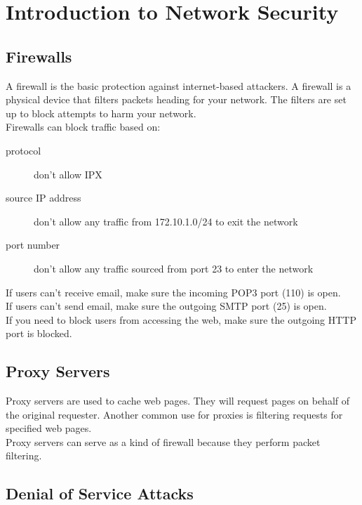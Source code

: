 \section{Introduction to Network Security}

\subsection{Firewalls}

A firewall is the basic protection against internet-based attackers. A
firewall is a physical device that filters packets heading for your network.
The filters are set up to block attempts to harm your network.\\

Firewalls can block traffic based on:

\begin{description}

\item[protocol]
don't allow IPX

\item[source IP address]
don't allow any traffic from 172.10.1.0/24 to exit the network

\item[port number]
don't allow any traffic sourced from port 23 to enter the network

\end{description}

If users can't receive email, make sure the incoming POP3 port (110) is open.\\

If users can't send email, make sure the outgoing SMTP port (25) is open.\\

If you need to block users from accessing the web, make sure the outgoing
HTTP port is blocked.

\subsection{Proxy Servers}

Proxy servers are used to cache web pages. They will request pages on behalf
of the original requester. Another common use for proxies is filtering
requests for specified web pages.\\

Proxy servers can serve as a kind of firewall because they perform packet
filtering.

\subsection{Denial of Service Attacks}

